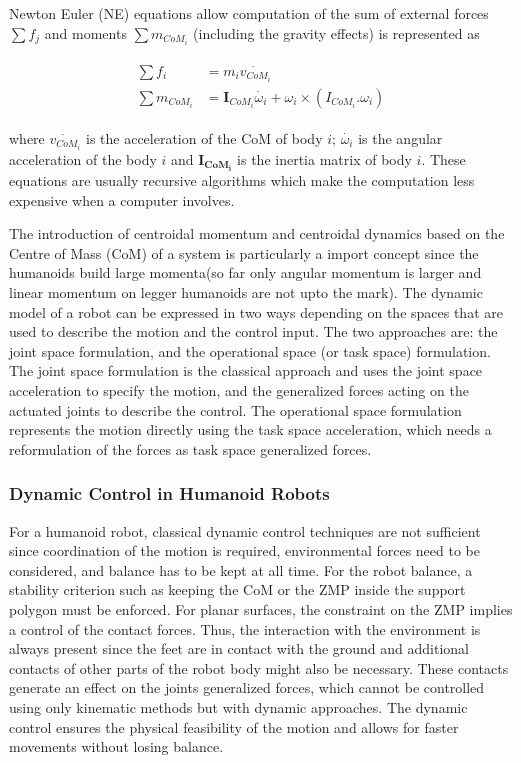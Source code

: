 \begin{enumerate}
    Newton Euler (NE) equations allow computation of the sum of external forces $\sum f_j$ and moments $\sum m_{CoM_i}$ (including the gravity effects) is represented as

    \begin{align}
        \begin{split}
            \sum f_i &= m_i\dot{v_{CoM_i}} \\
            \sum m_{CoM_i} &= \mathbf{I}_{CoM_i}\dot{\omega_i} + \omega_i \times (I_{CoM_i}.\omega_i)
        \end{split}
    \end{align}

    where $\dot{v_{CoM_i}}$ is the acceleration of the CoM of body $i$; $\dot{\omega_i}$ is the angular acceleration of the body $i$ and $\mathbf{I_{CoM_i}}$ is the inertia matrix of body $i$.
    These equations are usually recursive algorithms \cite{featherstone2014rigid,featherstone2000robot} which make the computation less expensive when a computer involves.

\end{enumerate}

The introduction of centroidal momentum and centroidal dynamics based on the Centre of Mass (CoM) of a system is particularly a import concept since the humanoids build large momenta(so far only
angular momentum is larger and linear momentum on legger humanoids are not upto the mark). The dynamic model of a robot can be expressed in two ways depending on the spaces that are used to describe the motion and the control input. The two approaches are: the joint space formulation, and the operational space 
(or task space) formulation. The joint space formulation is the classical approach and uses the joint space acceleration to specify the motion, and the generalized forces acting on the actuated joints 
to describe the control. The operational space formulation represents the motion directly using the task space acceleration, which needs a reformulation of the forces as task space generalized 
forces.

\subsubsection{Dynamic Control in Humanoid Robots}

For a humanoid robot, classical dynamic control techniques are not sufficient since coordination of the motion is required, environmental forces need to be considered, and balance has to be kept at all 
time. For the robot balance, a stability criterion such as keeping the CoM or the ZMP inside the support polygon must be enforced. For planar surfaces, the constraint on the 
ZMP implies a control of the contact forces. Thus, the interaction with the environment is always present since the feet are in contact with the ground and additional contacts of other parts of the robot 
body might also be necessary. These contacts generate an effect on the joints generalized forces, which cannot be controlled using only kinematic methods but with dynamic approaches. The dynamic control 
ensures the physical feasibility of the motion and allows for faster movements without losing balance.

